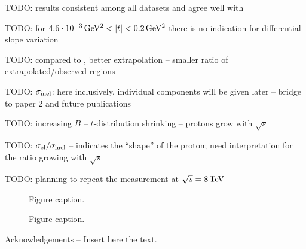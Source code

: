 \documentclass[doublecol]{../macros/epl2}
\def\un#1{\,{\rm #1}}
\begin{document}
TODO: results consistent among all datasets and agree well with \cite{epl96}

TODO: for $4.6\cdot10^{-3}\un{GeV^2} < |t| < 0.2\un{GeV^2}$ there is no indication for differential slope variation

TODO: compared to \cite{epl96}, better extrapolation -- smaller ratio of extrapolated/observed regions

TODO: $\sigma_{\rm inel}$: here inclusively, individual components will be given later -- bridge to paper 2 and future publications

TODO: increasing $B$ -- $t$-distribution shrinking -- protons grow with $\sqrt s$

TODO: $\sigma_{\rm el} / \sigma_{\rm inel}$ -- indicates the ``shape'' of the proton; need interpretation for the ratio growing with $\sqrt s$

TODO: planning to repeat the measurement at $\sqrt s = 8\un{TeV}$



\begin{figure}
\caption{Figure caption.}
\label{fig.1}
\end{figure}

\begin{figure}
\caption{Figure caption.}
\label{fig.1}
\end{figure}




\acknowledgments
Acknowledgements -- Insert here the text.


\begin{thebibliography}{0}





%

\end{thebibliography}
\end{document}
